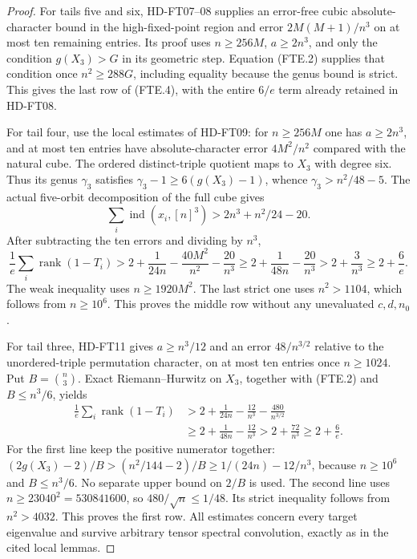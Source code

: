 \begin{proof}
For tails five and six, HD-FT07--08 supplies an error-free cubic
absolute-character bound in the high-fixed-point region and error
\(2M(M+1)/n^3\) on at most ten remaining entries.  Its proof uses
\(n\ge256M\), \(a\ge2n^3\), and only the condition
\(g(X_3)>G\) in its geometric step.  Equation (FTE.2) supplies that
condition once \(n^2\ge288G\), including equality because the genus
bound is strict.  This gives the last row of (FTE.4), with the entire
\(6/e\) term already retained in HD-FT08.

For tail four, use the local estimates of HD-FT09: for \(n\ge256M\)
one has \(a\ge2n^3\), and at most ten entries have absolute-character
error \(4M^2/n^2\) compared with the natural cube.  The ordered
distinct-triple quotient maps to \(X_3\) with degree six.  Thus its
genus \(\gamma_3\) satisfies
\(\gamma_3-1\ge6(g(X_3)-1)\), whence
\(\gamma_3>n^2/48-5\).  The actual five-orbit decomposition of the
full cube gives
\[
 \sum_i\operatorname{ind}(x_i,[n]^3)
   >2n^3+n^2/24-20.
 \tag{FTE.5}
\]
After subtracting the ten errors and dividing by \(n^3\),
\[
 \frac1e\sum_i\operatorname{rank}(1-T_i)
 >2+\frac1{24n}-\frac{40M^2}{n^2}-\frac{20}{n^3}
 \ge2+\frac1{48n}-\frac{20}{n^3}
 >2+\frac3{n^3}\ge2+\frac6e.
 \tag{FTE.6}
\]
The weak inequality uses \(n\ge1920M^2\).  The last strict one
uses \(n^2>1104\), which follows from \(n\ge10^6\).
This proves the middle row without any unevaluated \(c,d,n_0\).

For tail three, HD-FT11 gives \(a\ge n^3/12\) and an error
\(48/n^{3/2}\) relative to the unordered-triple permutation
character, on at most ten entries once \(n\ge1024\).
Put \(B=\binom n3\).  Exact Riemann--Hurwitz on \(X_3\), together
with (FTE.2) and \(B\le n^3/6\), yields
\[
 \begin{split}
 \frac1e\sum_i\operatorname{rank}(1-T_i)
 &>2+\frac1{24n}-\frac{12}{n^3}-\frac{480}{n^{3/2}}\\
 &\ge2+\frac1{48n}-\frac{12}{n^3}
 >2+\frac{72}{n^3}\ge2+\frac6e.
 \end{split}
 \tag{FTE.7}
\]
For the first line keep the positive numerator together:
\((2g(X_3)-2)/B>(n^2/144-2)/B
\ge1/(24n)-12/n^3\), because \(n\ge10^6\) and
\(B\le n^3/6\).  No separate upper bound on \(2/B\) is used.
The second line uses
\(n\ge23040^2=530841600\), so \(480/\sqrt n\le1/48\).
Its strict inequality follows from \(n^2>4032\).
This proves the first row.  All estimates concern every target
eigenvalue and survive arbitrary tensor spectral convolution,
exactly as in the cited local lemmas.
\end{proof}

